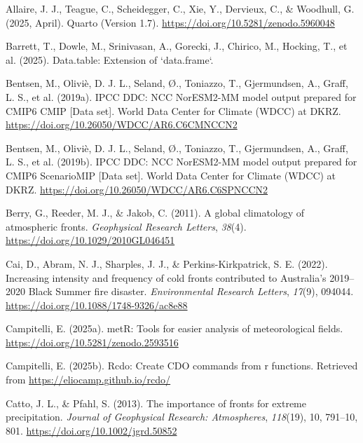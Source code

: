 \documentclass[
]{agujournal2019}
\newlength{\cslhangindent}
\newenvironment{CSLReferences}[2] %
 {\begin{list}{}{%
  \setlength{\itemindent}{0pt}
  \setlength{\leftmargin}{0pt}
  \setlength{\parsep}{0pt}
  \ifodd #1
   \setlength{\leftmargin}{\cslhangindent}
   \setlength{\itemindent}{-1\cslhangindent}
  \fi
  \setlength{\itemsep}{#2\baselineskip}}}
 {\end{list}}
\begin{document}
\label{refs}
\begin{CSLReferences}{1}{0}
\vspace{1em}

Allaire, J. J., Teague, C., Scheidegger, C., Xie, Y., Dervieux, C., \&
Woodhull, G. (2025, April). {Quarto} (Version 1.7).
\url{https://doi.org/10.5281/zenodo.5960048}

Barrett, T., Dowle, M., Srinivasan, A., Gorecki, J., Chirico, M.,
Hocking, T., et al. (2025). Data.table: Extension of `data.frame`.

Bentsen, M., Oliviè, D. J. L., Seland, Ø., Toniazzo, T., Gjermundsen,
A., Graff, L. S., et al. (2019a). {IPCC DDC}: {NCC NorESM2-MM} model
output prepared for {CMIP6 CMIP} {[}Data set{]}. World Data Center for
Climate (WDCC) at DKRZ.
\url{https://doi.org/10.26050/WDCC/AR6.C6CMNCCN2}

Bentsen, M., Oliviè, D. J. L., Seland, Ø., Toniazzo, T., Gjermundsen,
A., Graff, L. S., et al. (2019b). {IPCC DDC}: {NCC NorESM2-MM} model
output prepared for {CMIP6 ScenarioMIP} {[}Data set{]}. World Data
Center for Climate (WDCC) at DKRZ.
\url{https://doi.org/10.26050/WDCC/AR6.C6SPNCCN2}

Berry, G., Reeder, M. J., \& Jakob, C. (2011). A global climatology of
atmospheric fronts. \emph{Geophysical Research Letters}, \emph{38}(4).
\url{https://doi.org/10.1029/2010GL046451}

Cai, D., Abram, N. J., Sharples, J. J., \& Perkins-Kirkpatrick, S. E.
(2022). Increasing intensity and frequency of cold fronts contributed to
{Australia}'s 2019--2020 {Black Summer} fire disaster.
\emph{Environmental Research Letters}, \emph{17}(9), 094044.
\url{https://doi.org/10.1088/1748-9326/ac8e88}

Campitelli, E. (2025a). metR: Tools for easier analysis of
meteorological fields. \url{https://doi.org/10.5281/zenodo.2593516}

Campitelli, E. (2025b). Rcdo: Create CDO commands from r functions.
Retrieved from \url{https://eliocamp.github.io/rcdo/}

Catto, J. L., \& Pfahl, S. (2013). The importance of fronts for extreme
precipitation. \emph{Journal of Geophysical Research: Atmospheres},
\emph{118}(19), 10, 791--10, 801.
\url{https://doi.org/10.1002/jgrd.50852}


\end{CSLReferences}
\end{document}
